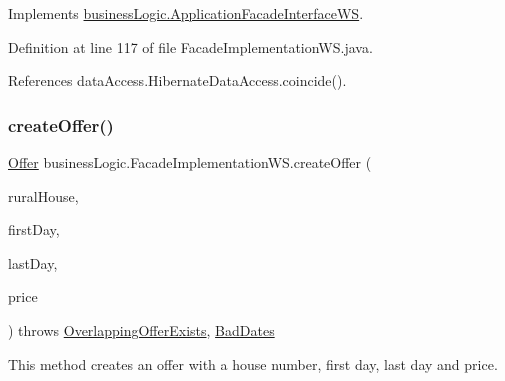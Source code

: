 Implements \mbox{\hyperlink{interfacebusinessLogic_1_1ApplicationFacadeInterfaceWS_aa56165d498ff54ccd651fe5ce9a50902}{business\+Logic.\+Application\+Facade\+Interface\+WS}}.



Definition at line 117 of file Facade\+Implementation\+W\+S.\+java.


\begin{DoxyCode}{0}

\end{DoxyCode}


References data\+Access.\+Hibernate\+Data\+Access.\+coincide().

\mbox{\label{classbusinessLogic_1_1FacadeImplementationWS_ac7b3bdfd0815ea7c787da312de594cce}} 
\subsubsection{\texorpdfstring{createOffer()}{createOffer()}}
{\footnotesize\ttfamily \mbox{\hyperlink{classdomain_1_1Offer}{Offer}} business\+Logic.\+Facade\+Implementation\+W\+S.\+create\+Offer (\begin{DoxyParamCaption}\item[{\mbox{\hyperlink{classdomain_1_1RuralHouse}{Rural\+House}}}]{rural\+House,  }\item[{Date}]{first\+Day,  }\item[{Date}]{last\+Day,  }\item[{float}]{price }\end{DoxyParamCaption}) throws \mbox{\hyperlink{classexceptions_1_1OverlappingOfferExists}{Overlapping\+Offer\+Exists}}, \mbox{\hyperlink{classexceptions_1_1BadDates}{Bad\+Dates}}}



This method creates an offer with a house number, first day, last day and price. 


